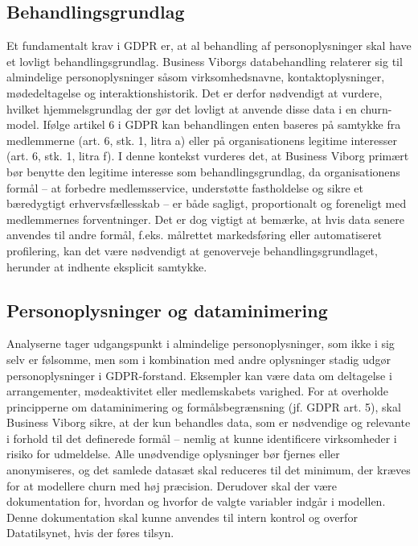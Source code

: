 \documentclass[
  11pt,
  letterpaper,
  DIV=11,
  numbers=noendperiod]{scrartcl}
\begin{document}
\subsection{Behandlingsgrundlag}\label{behandlingsgrundlag}

Et fundamentalt krav i GDPR er, at al behandling af personoplysninger
skal have et lovligt behandlingsgrundlag. Business Viborgs
databehandling relaterer sig til almindelige personoplysninger såsom
virksomhedsnavne, kontaktoplysninger, mødedeltagelse og
interaktionshistorik. Det er derfor nødvendigt at vurdere, hvilket
hjemmelsgrundlag der gør det lovligt at anvende disse data i en
churn-model. Ifølge artikel 6 i GDPR kan behandlingen enten baseres på
samtykke fra medlemmerne (art. 6, stk. 1, litra a) eller på
organisationens legitime interesser (art. 6, stk. 1, litra f). I denne
kontekst vurderes det, at Business Viborg primært bør benytte den
legitime interesse som behandlingsgrundlag, da organisationens formål --
at forbedre medlemsservice, understøtte fastholdelse og sikre et
bæredygtigt erhvervsfællesskab -- er både sagligt, proportionalt og
foreneligt med medlemmernes forventninger. Det er dog vigtigt at
bemærke, at hvis data senere anvendes til andre formål, f.eks. målrettet
markedsføring eller automatiseret profilering, kan det være nødvendigt
at genoverveje behandlingsgrundlaget, herunder at indhente eksplicit
samtykke.

\subsection{Personoplysninger og
dataminimering}\label{personoplysninger-og-dataminimering}

Analyserne tager udgangspunkt i almindelige personoplysninger, som ikke
i sig selv er følsomme, men som i kombination med andre oplysninger
stadig udgør personoplysninger i GDPR-forstand. Eksempler kan være data
om deltagelse i arrangementer, mødeaktivitet eller medlemskabets
varighed. For at overholde principperne om dataminimering og
formålsbegrænsning (jf. GDPR art. 5), skal Business Viborg sikre, at der
kun behandles data, som er nødvendige og relevante i forhold til det
definerede formål -- nemlig at kunne identificere virksomheder i risiko
for udmeldelse. Alle unødvendige oplysninger bør fjernes eller
anonymiseres, og det samlede datasæt skal reduceres til det minimum, der
kræves for at modellere churn med høj præcision. Derudover skal der være
dokumentation for, hvordan og hvorfor de valgte variabler indgår i
modellen. Denne dokumentation skal kunne anvendes til intern kontrol og
overfor Datatilsynet, hvis der føres tilsyn.
\end{document}
